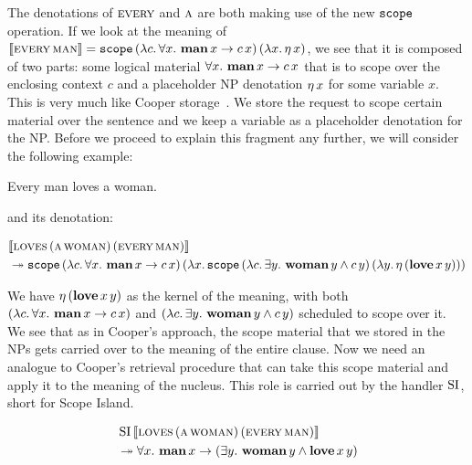 The denotations of $\textsc{every}$ and $\textsc{a}$ are both making use of the
new $\mathtt{scope}$ operation. If we look at the meaning of
$\llbracket \textsc{every}\,\textsc{man} \rrbracket = \mathtt{scope}\,(\lambda c.\, \forall x.\
    \textbf{man}\,x \to c\,x)\,(\lambda x.\, \eta\,x)$, we see that
it is composed of two parts: some logical material
$\forall x.\ \textbf{man}\,x \to c\,x$ that is to scope over the
enclosing context $c$ and a placeholder NP denotation $\eta\,x$ for some
variable $x$. This is very much like Cooper
storage~\cite{cooper1979montague}. We store the request to scope certain
material over the sentence and we keep a variable as a placeholder
denotation for the NP. Before we proceed to explain this fragment any
further, we will consider the following example:

\begin{exe}
  \ex Every man loves a woman. \label{ex:quantifiers}
\end{exe}

and its denotation:

\NoChapterPrefix
\begin{align}
& \sem{\app{\abs{loves}}{(\ap{\abs{a}}{\abs{woman}})}{(\ap{\abs{every}}{\abs{man}})}} \nonumber \\
&\tto \app{\op{scope}}{(\lam{c}{\forall x.\ \ap{\obj{man}}{x} \to \ap{c}{x}})}{(\lam{x}{\app{\op{scope}}{(\lam{c}{\exists y.\ \ap{\obj{woman}}{y} \land \ap{c}{y}})}{(\lam{y}{\etaE{(\app{\obj{love}}{x}{y})}})}})}
\end{align}
\ChapterPrefix

We have $\eta\,(\textbf{love}\,x\,y)$ as the kernel of the meaning,
with both $(\lambda c.\, \forall x.\ \textbf{man}\,x \to c\,x)$ and
$(\lam{c}{\exists y.\ \ap{\obj{woman}}{y} \land \ap{c}{y}})$ scheduled to
scope over it. We see that as in Cooper's approach, the scope material that
we stored in the NPs gets carried over to the meaning of the entire
clause. Now we need an analogue to Cooper's retrieval procedure that can
take this scope material and apply it to the meaning of the nucleus. This
role is carried out by the handler $\operatorname{SI}$, short for Scope Island.

\begin{align*}
& \ap{\SI}{\sem{\app{\abs{loves}}{(\ap{\abs{a}}{\abs{woman}})}{(\ap{\abs{every}}{\abs{man}})}}} \\
&\tto \forall x.\ \ap{\obj{man}}{x} \to (\exists y.\ \ap{\obj{woman}}{y} \land \app{\obj{love}}{x}{y})
\end{align*}

